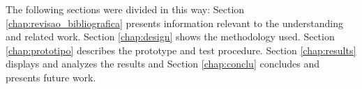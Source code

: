 %    
    The following sections were divided in this way:
    Section \ref{chap:revisao_bibliografica} presents information relevant to the understanding and related work.
    Section \ref{chap:design} shows the methodology used.
    Section \ref{chap:prototipo} describes the prototype and test procedure.
    Section \ref{chap:results} displays and analyzes the results and Section \ref{chap:conclu} concludes and presents future work.
    
